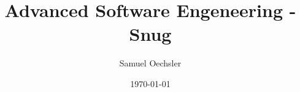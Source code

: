 \documentclass[
    paper    = A4,
    fontsize = 12pt,
    parskip  = full,
]{scrarticle}
\title{Advanced Software Engeneering - Snug}
\author{Samuel Oechsler}
\date{\today}
\begin{document}
    \maketitle
    \setcounter{page}{0}
    \thispagestyle{empty}

    \newpage
    \tableofcontents

    \begin{spacing}{1.2}
        
        
        
        
        
        
    \end{spacing}

    \newpage
    \printbibliography
\end{document}
